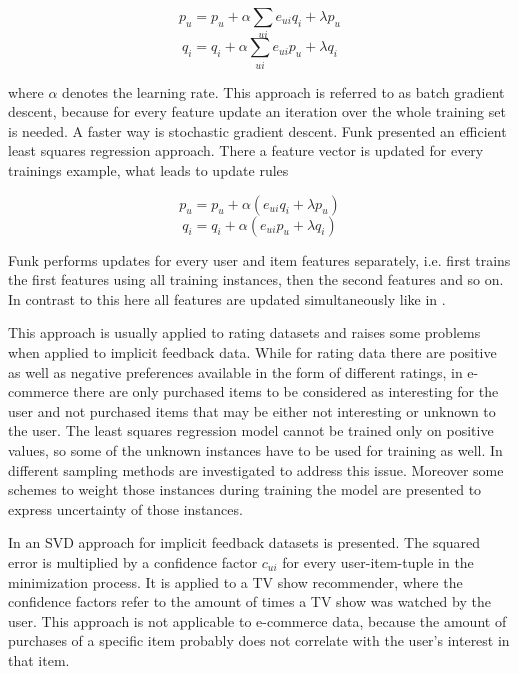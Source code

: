 \documentclass[10pt]{reportMaster}
\begin{document}
\begin{equation}
\label{eq:updateLinRegP}
	p_u = p_u + \alpha \sum_{ui}{e_{ui} q_i + \lambda p_u}
\end{equation}
\begin{equation}
\label{eq:updateLinRegQ}
	q_i = q_i + \alpha \sum_{ui}{e_{ui} p_u + \lambda q_i}
\end{equation}

where $\alpha$ denotes the learning rate.
This approach is referred to as batch gradient descent, because for every feature update an iteration over the whole training set is needed.
A faster way is stochastic gradient descent.
Funk \cite{funkLeastSquares} presented an efficient least squares regression approach.
There a feature vector is updated for every trainings example, what leads to update rules 

\begin{equation}
	p_u = p_u + \alpha (e_{ui} q_i + \lambda p_u)
\end{equation}
\begin{equation}
	q_i = q_i + \alpha (e_{ui} p_u + \lambda q_i)
\end{equation}

Funk performs updates for every user and item features separately, i.e. first trains the first features using all training instances, then the second features and so on.
In contrast to this here all features are updated simultaneously like in \cite{matrixFactorizationDifRegParam}.

This approach is usually applied to rating datasets and raises some problems when applied to implicit feedback data.
While for rating data there are positive as well as negative preferences available in the form of different ratings, in e-commerce there are only purchased items to be considered as interesting for the user and not purchased items that may be either not interesting or unknown to the user.
The least squares regression model cannot be trained only on positive values, so some of the unknown instances have to be used for training as well.
In \cite{occf} different sampling methods are investigated to address this issue.
Moreover some schemes to weight those instances during training the model are presented to express uncertainty of those instances.

In \cite{CFForImplFeedback} an SVD approach for implicit feedback datasets is presented.
The squared error is multiplied by a confidence factor $c_{ui}$ for every user-item-tuple in the minimization process.
It is applied to a TV show recommender, where the confidence factors refer to the amount of times a TV show was watched by the user.
This approach is not applicable to e-commerce data, because the amount of purchases of a specific item probably does not correlate with the user's interest in that item.
\end{document}

